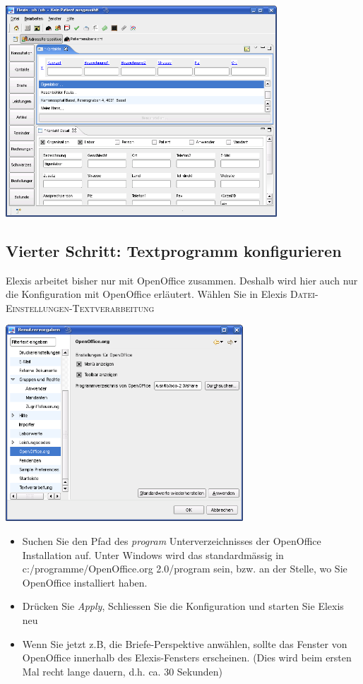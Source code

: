 \includegraphics[width=4in]{images/grundkonfmand1.png}
\subsection{Vierter Schritt: Textprogramm konfigurieren}

Elexis arbeitet bisher nur mit OpenOffice zusammen. Deshalb wird hier auch nur die Konfiguration mit OpenOffice erläutert.
Wählen Sie in Elexis \textsc{Datei-Einstellungen-Textverarbeitung}

\includegraphics[width=3.5in]{images/grundkonfmand2.png}

\begin{itemize}
 \item Suchen Sie den Pfad des \textit{program} Unterverzeichnisses der OpenOffice Installation auf. Unter Windows wird das standardmässig in c:/programme/OpenOffice.org 2.0/program sein, bzw. an der Stelle, wo Sie OpenOffice installiert haben.
 \item Drücken Sie \textit{Apply}, Schliessen Sie die Konfiguration und starten Sie Elexis neu
 \item Wenn Sie jetzt z.B, die Briefe-Perspektive anwählen, sollte das Fenster von OpenOffice innerhalb des Elexis-Fensters erscheinen. (Dies wird beim ersten Mal recht lange dauern, d.h. ca. 30 Sekunden)
\end{itemize}

